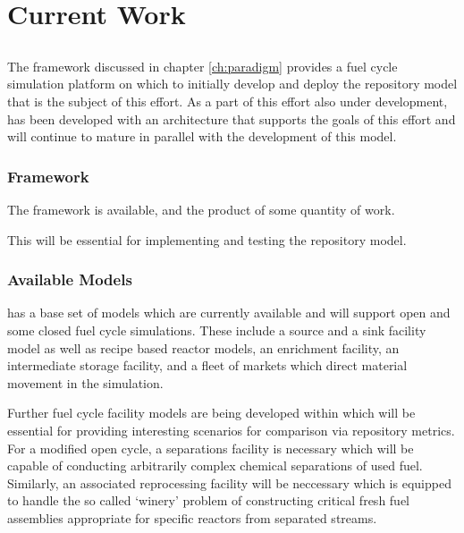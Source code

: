 \chapter{Current Work}\label{ch:current}

\section{\Cyclus}

The \Cyclus framework discussed in chapter \ref{ch:paradigm} provides a fuel 
cycle simulation platform on which to initially develop and deploy the 
repository model that is the subject of this effort. As a part of this effort 
also under development, \Cyclus has been developed with an architecture that 
supports the goals of this effort and will continue to mature in parallel with 
the development of this model.

\subsection{Framework}

The \Cyclus framework is available, and the product of some quantity of work. 

This will be essential for implementing and testing the repository model.

\subsection{Available Models}

\Cyclus has a base set of models which are currently available and will support 
open and some closed fuel cycle simulations. These include a source and a sink 
facility model as well as recipe based reactor models, an enrichment facility, 
an intermediate storage facility, and a fleet of markets which direct material 
movement in the simulation.

Further fuel cycle facility models are being developed within \Cyclus  which 
will be essential for providing interesting scenarios for comparison via 
repository metrics. For a modified open cycle, a separations facility is 
necessary which will be capable of conducting arbitrarily complex chemical 
separations of used fuel. Similarly, an associated reprocessing facility  will 
be neccessary which is equipped to handle the so called `winery' problem of 
constructing critical fresh fuel assemblies appropriate for specific reactors 
from separated streams.


